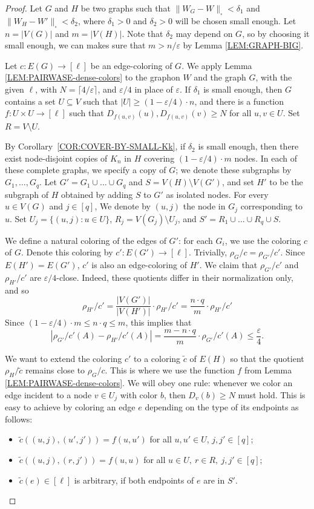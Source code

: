\documentclass[10pt]{article}
\theoremstyle{plain}
\theoremstyle{definition}
\newcommand{\tc}{\tilde{c}}
\begin{document}
\begin{proof}
Let $G$ and $H$ be two graphs such that $\|W_G-W\|_\square<\delta_1$ and $\|W_H-W'\|_\square<\delta_2$, where $\delta_1>0$ and $\delta_2>0$  will be chosen small enough. Let $n=|V(G)|$ and $m=|V(H)|$. Note that $\delta_2$ may depend on $G$, so by choosing it small enough, we can makes sure that  $m>n/\varepsilon$ by Lemma \ref{LEM:GRAPH-BIG}.

Let $c\colon  E(G)\to[\ell]$ be an edge-coloring of $G$. We apply Lemma \ref{LEM:PAIRWASE-dense-colors} to the graphon $W$ and the graph $G$, with the given $\ell$, with $N=\lceil 4/\varepsilon\rceil$, and $\varepsilon/4$ in place of $\varepsilon$. If $\delta_1$ is small enough, then $G$ contains a set $U\subseteq V$ such that $|U|\ge(1-\varepsilon/4)\cdot n$, and there is a function $f\colon U\times U\to[\ell]$ such that $D_{f(u,v)}(u),D_{f(u,v)}(v)\ge N$ for all $u,v\in U$. Set $R=V\setminus U$.
    
By Corollary~\ref{COR:COVER-BY-SMALL-Kk}, if $\delta_2$ is small enough, then there exist node-disjoint copies of $K_n$ in $H$ covering $(1-\varepsilon/4)\cdot m$ nodes. In each of these complete graphs, we specify a copy of $G$; we denote these subgraphs by $G_1,\dots,G_q$. 
Let $G'=G_1\cup\dots\cup G_q$ and $S=V(H)\setminus V(G')$, and set $H'$ to be the subgraph of $H$ obtained by adding $S$ to $G'$ as isolated nodes. For every $u\in V(G)$ and $j\in[q]$, We denote by $(u,j)$ the node in $G_j$ corresponding to $u$. Set $U_j=\{(u,j)\colon u\in U\}$, $R_j=V(G_j)\setminus U_j$, and $S'=R_1\cup\dots\cup R_q\cup S$. 

We define a natural coloring of the edges of $G'$: for each $G_i$, we use the coloring $c$ of $G$. Denote this coloring by $c'\colon E(G')\to [\ell]$. Trivially, $\rho_G/c=\rho_{G'}/{c'}$. Since $E(H')=E(G')$, $c'$ is also an edge-coloring of $H'$. We claim that $\rho_{G'}/{c'}$ and $\rho_{H'}/{c'}$ are $\varepsilon/4$-close. Indeed, these quotients differ in their normalization only, and so
    \[
    \rho_{H'}/{c'} = \frac{|V(G')|}{|V(H')|}\cdot\rho_{H'}/{c'}=\frac{n\cdot q}{m}\cdot\rho_{H'}/{c'}
    \]
Since $(1-\varepsilon/4)\cdot m \le n\cdot q\le m$, this implies that
    \[
    |\rho_{G'}/{c'}(A)-\rho_{H'}/{c'}(A)| =  \frac{m-n\cdot q}{m}\cdot\rho_{G'}/{c'} (A) \le \frac{\varepsilon}{4}.
    \]

    We want to extend the coloring $c'$ to a coloring $\tc$ of $E(H)$ so that the quotient $\rho_H/\tc$ remains close to $\rho_G/c$. This is where we use the function $f$ from Lemma \ref{LEM:PAIRWASE-dense-colors}. We will obey one rule: whenever we color an edge incident to a node $v\in U_j$ with color $b$, then $D_v(b)\ge N$ must hold. This is easy to achieve by coloring an edge $e$ depending on the type of its endpoints as follows:
    \begin{itemize}
        \item $\tc((u,j),(u',j'))=f(u,u')$ for all $u,u'\in U$, $j,j'\in [q]$;
        \item $\tc((u,j),(r,j'))=f(u,u)$ for all $u\in U,\ r\in R,\ j,j'\in [q]$;
        \item $\tc(e)\in[\ell]$ is arbitrary, if both endpoints of $e$ are in $S'$.
    \end{itemize}


\end{proof}
\end{document}
